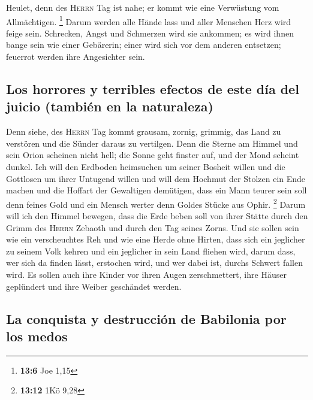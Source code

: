  Heulet, denn des \textsc{Herrn} Tag ist nahe; er kommt
wie eine Verwüstung vom Allmächtigen. \footnote{\textbf{13:6} Joe 1,15}
 Darum werden alle Hände lass und aller Menschen Herz wird
feige sein.  Schrecken, Angst und Schmerzen wird sie
ankommen; es wird ihnen bange sein wie einer Gebärerin; einer wird sich
vor dem anderen entsetzen; feuerrot werden ihre Angesichter sein.

\hypertarget{los-horrores-y-terribles-efectos-de-este-duxeda-del-juicio-tambiuxe9n-en-la-naturaleza}{%
\subsection{Los horrores y terribles efectos de este día del juicio
(también en la
naturaleza)}\label{los-horrores-y-terribles-efectos-de-este-duxeda-del-juicio-tambiuxe9n-en-la-naturaleza}}

 Denn siehe, des \textsc{Herrn} Tag kommt grausam, zornig,
grimmig, das Land zu verstören und die Sünder daraus zu vertilgen.
 Denn die Sterne am Himmel und sein Orion scheinen nicht
hell; die Sonne geht finster auf, und der Mond scheint dunkel.
 Ich will den Erdboden heimsuchen um seiner Bosheit
willen und die Gottlosen um ihrer Untugend willen und will dem Hochmut
der Stolzen ein Ende machen und die Hoffart der Gewaltigen demütigen,
 dass ein Mann teurer sein soll denn feines Gold und ein
Mensch werter denn Goldes Stücke aus Ophir. \footnote{\textbf{13:12} 1Kö
  9,28}  Darum will ich den Himmel bewegen, dass die Erde
beben soll von ihrer Stätte durch den Grimm des \textsc{Herrn} Zebaoth
und durch den Tag seines Zorns.  Und sie sollen sein wie
ein verscheuchtes Reh und wie eine Herde ohne Hirten, dass sich ein
jeglicher zu seinem Volk kehren und ein jeglicher in sein Land fliehen
wird,  darum dass, wer sich da finden lässt, erstochen
wird, und wer dabei ist, durchs Schwert fallen wird.  Es
sollen auch ihre Kinder vor ihren Augen zerschmettert, ihre Häuser
geplündert und ihre Weiber geschändet werden.

\hypertarget{la-conquista-y-destrucciuxf3n-de-babilonia-por-los-medos}{%
\subsection{La conquista y destrucción de Babilonia por los
medos}\label{la-conquista-y-destrucciuxf3n-de-babilonia-por-los-medos}}

